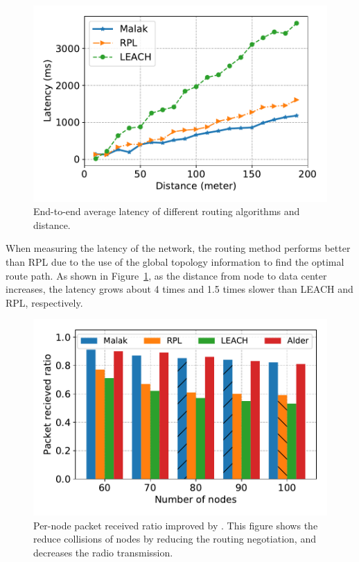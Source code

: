 \begin{figure}[!h]
	\centering
	\includegraphics[width=.95\columnwidth]{Figure/latency}
	\vspace{-0.1in}
	\caption{End-to-end average latency of different routing algorithms and distance.
		\textnormal{
	}}
	\label{fig:latency}
\end{figure}

When measuring the latency of the network, the {\sdn} routing method performs
better than RPL due to the use of the global topology information to find the
optimal route path. As shown in Figure~\ref{fig:latency}, as the distance from
node to data center increases, the latency grows about 4 times and 1.5 times
slower than LEACH and RPL, respectively.

\begin{figure}[!h]
	\centering
	\includegraphics[width=.95\columnwidth]{Figure/packet_loss_ratio_with_size}
	\vspace{-0.1in}
	\caption{Per-node packet received ratio improved by {\sdn}.
		\textnormal{
			This figure shows the {\sdn} reduce collisions of nodes by
			reducing the routing negotiation, and decreases the radio
			transmission.
	}}
	\label{fig:packet_loss_ratio_with_size}
\end{figure}

